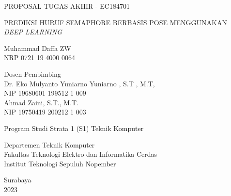 \begin{large}
  PROPOSAL TUGAS AKHIR - EC184701
\end{large}

\vspace{\fill}

\begin{spacing}{1.5}
  \begin{Large}
    PREDIKSI HURUF SEMAPHORE BERBASIS POSE MENGGUNAKAN \textit{DEEP LEARNING}%
  \end{Large}
\end{spacing}

\vspace{\fill}

\begin{large}
  Muhammad Daffa ZW \\
  \textnormal{NRP 0721 19 4000 0064}
\end{large}

\vspace{\fill}

\begin{large}
  \textnormal{Dosen Pembimbing} \\
  Dr. Eko Mulyanto Yuniarno Yuniarno , S.T , M.T, \\
  \textnormal{NIP 19680601  199512 1 009} \\
  Ahmad Zaini, S.T., M.T. \\
  \textnormal{NIP 19750419  200212 1 003}
\end{large}

\vspace{\fill}

Program Studi Strata 1 (S1) Teknik Komputer \\

\normalfont

Departemen Teknik Komputer \\
Fakultas Teknologi Elektro dan Informatika Cerdas \\
Institut Teknologi Sepuluh Nopember

Surabaya \\
2023